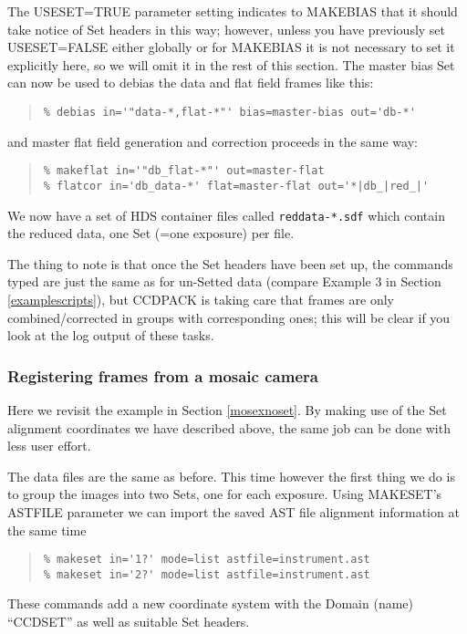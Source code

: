 \documentclass[twoside,11pt]{article}
\newcommand{\htmlref}[2]{#1}
\renewcommand{\_}{\texttt{\symbol{95}}}
\newenvironment{myquote}{\begin{quote}\begin{small}}{\end{small}\end{quote}}
\newcommand{\text}[1]{{\small \tt #1}}
\newcommand{\routine}[1]{{\sc #1}}
\newcommand{\xroutine}[1]{\htmlref{{\sc #1}}{#1}}
\begin{document}
The USESET=TRUE parameter setting indicates to \routine{MAKEBIAS}
that it should take notice of Set headers in this way; however,
unless you have previously set USESET=FALSE either globally or
for \routine{MAKEBIAS} it is not necessary to set it explicitly 
here, so we will omit it in the rest of this section.
The master bias Set can now be used to debias the data and flat field
frames like this:
\begin{myquote}
\begin{verbatim}
% debias in='"data-*,flat-*"' bias=master-bias out='db-*'
\end{verbatim}
\end{myquote}
and master flat field generation and correction proceeds in the same way:
\begin{myquote}
\begin{verbatim}
% makeflat in='"db_flat-*"' out=master-flat
% flatcor in='db_data-*' flat=master-flat out='*|db_|red_|'
\end{verbatim}
\end{myquote}
We now have a set of HDS container files called \text{red\_data-*.sdf}
which contain the reduced data, one Set (=one exposure) per file.

The thing to note is that once the Set headers have been set up,
the commands typed are just the same as for un-Setted data
(compare Example 3 in Section \ref{examplescripts}),
but CCDPACK is taking care that frames are only combined/corrected
in groups with corresponding ones; this will be clear if you 
look at the log output of these tasks.


\subsubsection{\label{mosexset}Registering frames from a mosaic camera}

Here we revisit the example in Section \ref{mosexnoset}.
By making use of the Set alignment coordinates we have described above,
the same job can be done with less user effort.

The data files are the same as before. 
This time however the first thing we do is to group the 
images into two Sets, one for each exposure.  Using \xroutine{MAKESET}'s
ASTFILE parameter we can import the saved AST file alignment information
at the same time
\begin{myquote}
\begin{verbatim}
% makeset in='1?' mode=list astfile=instrument.ast
% makeset in='2?' mode=list astfile=instrument.ast
\end{verbatim}
\end{myquote}
These commands add a new coordinate system with the Domain (name)
``CCD\_SET'' as well as suitable Set headers.
\end{document}

